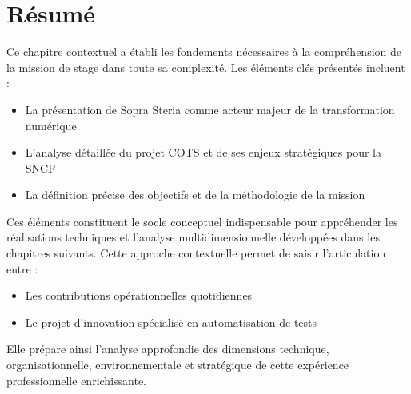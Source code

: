 \section{Résumé}

Ce chapitre contextuel a établi les fondements nécessaires à la compréhension de la mission de stage dans toute sa complexité. Les éléments clés présentés incluent :

\begin{itemize}
    \item La présentation de Sopra Steria comme acteur majeur de la transformation numérique
    \item L'analyse détaillée du projet COTS et de ses enjeux stratégiques pour la SNCF
    \item La définition précise des objectifs et de la méthodologie de la mission
\end{itemize}

Ces éléments constituent le socle conceptuel indispensable pour appréhender les réalisations techniques et l'analyse multidimensionnelle développées dans les chapitres suivants. Cette approche contextuelle permet de saisir l'articulation entre :
\begin{itemize}
    \item Les contributions opérationnelles quotidiennes
    \item Le projet d'innovation spécialisé en automatisation de tests
\end{itemize}

Elle prépare ainsi l'analyse approfondie des dimensions technique, organisationnelle, environnementale et stratégique de cette expérience professionnelle enrichissante.